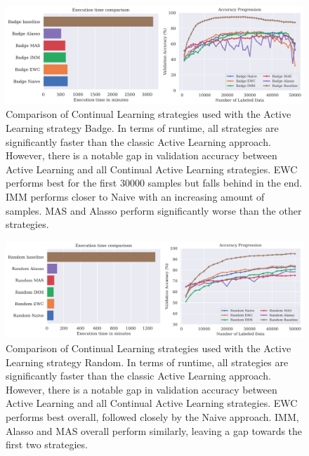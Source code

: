 \begin{figure} [ht]
    \centering
    \includegraphics[width=\linewidth]{images/results_CAL/Badge_CAL_1000b.png}
    \caption[Continual Active Learning Badge 1000 batch size]{Comparison of Continual Learning strategies used with the Active Learning strategy Badge. In terms of runtime, all
    strategies are significantly faster than the classic Active Learning approach. However, there is a notable gap in validation accuracy between Active Learning and all Continual
    Active Learning strategies. EWC performs best for the first 30000 samples but falls behind in the end. IMM performs closer to Naive with an increasing amount of samples. MAS and
    Alasso perform significantly worse than the other strategies.}
    \label{fig:Evaluation:Results:CAL:Badge1000}
\end{figure}




\begin{figure} [ht]
    \centering
    \includegraphics[width=\linewidth]{images/results_CAL/Random_CAL_2000b.png}
    \caption[Continual Active Learning Random 2000 batch size]{Comparison of Continual Learning strategies used with the Active Learning strategy Random. In terms of runtime, all
    strategies are significantly faster than the classic Active Learning approach. However, there is a notable gap in validation accuracy between Active Learning and all Continual
    Active Learning strategies. EWC performs best overall, followed closely by the Naive approach. IMM, Alasso and MAS overall perform similarly, leaving a gap towards the first 
    two strategies.}
    \label{fig:Evaluation:Results:CAL:Random2000}
\end{figure}

